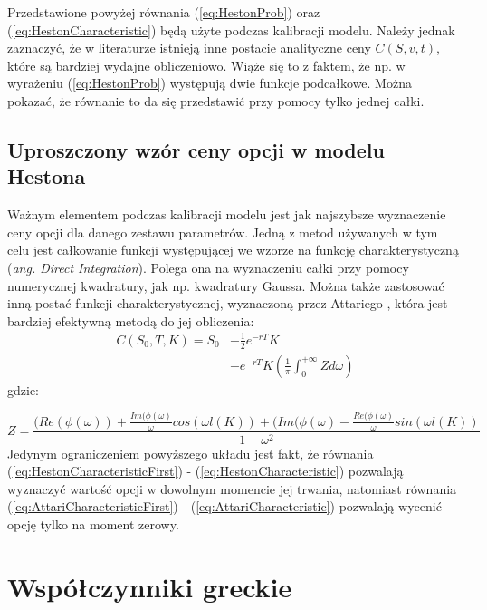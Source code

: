 \documentclass{pracamgr}
\begin{document}
Przedstawione powyżej równania (\ref{eq:HestonProb}) oraz 
(\ref{eq:HestonCharacteristic}) będą użyte podczas kalibracji modelu. Należy jednak zaznaczyć, że 
w literaturze istnieją inne postacie analityczne ceny $C(S, v, t)$, które są bardziej wydajne 
obliczeniowo. 
Wiąże się to z faktem, że np. w wyrażeniu (\ref{eq:HestonProb}) występują dwie funkcje podcałkowe. 
Można pokazać, że równanie to da się przedstawić przy pomocy tylko jednej całki.

\subsection{Uproszczony wzór ceny opcji w modelu Hestona} %
\label{sec:numeryczne_wyznaczenie_warto_ci_funkcji_charakterystycznej}

Ważnym elementem podczas kalibracji modelu jest jak najszybsze wyznaczenie ceny opcji dla danego
zestawu parametrów. 
Jedną z metod używanych w tym celu jest całkowanie funkcji występującej we wzorze na funkcję
charakterystyczną (\textit{ang. Direct Integration}). Polega ona na wyznaczeniu całki przy pomocy
numerycznej kwadratury, jak np. kwadratury Gaussa. Można także zastosować
inną postać funkcji charakterystycznej, wyznaczoną przez Attariego \cite{Attari}, która jest bardziej efektywną metodą do jej obliczenia:
\begin{equation}
\label{eq:AttariCharacteristicFirst}
\begin{aligned}
  C(S_0, T, K) = S_0 &- \frac{1}{2} e^{-rT}K  \\ 
  &- e^{-rT} K 
  \left( \frac{1}{\pi} \int_0^{+\infty} Z d\omega \right)
    \end{aligned}
\end{equation}
gdzie:

\begin{equation}
\label{eq:AttariCharacteristic}
  Z = \frac{
(Re(\phi (\omega) )
+\frac{Im(\phi (\omega)}{\omega}
cos(\omega l (K)) +
(Im(\phi (\omega) - \frac{Re(\phi (\omega)}{\omega}
sin(\omega l (K))
}{1 + \omega^2}
\end{equation}
Jedynym ograniczeniem powyższego układu jest fakt, że równania 
(\ref{eq:HestonCharacteristicFirst}) - (\ref{eq:HestonCharacteristic}) pozwalają wyznaczyć wartość opcji w 
dowolnym momencie jej trwania, natomiast równania 
(\ref{eq:AttariCharacteristicFirst}) - (\ref{eq:AttariCharacteristic}) pozwalają wycenić 
opcję tylko na moment zerowy.


\section{Współczynniki greckie}
\end{document}
